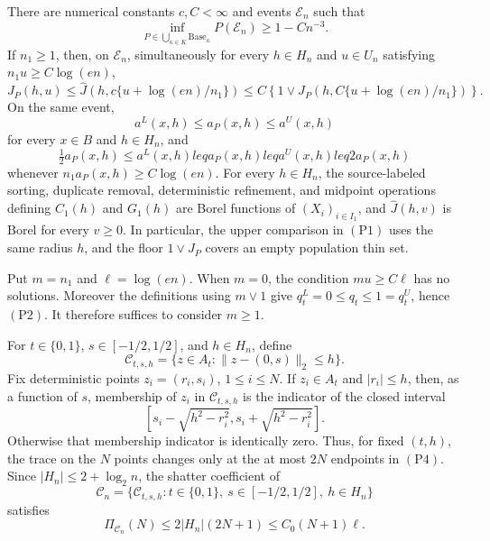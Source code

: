 There are numerical constants \(c,C<\infty\) and events \(\mathcal E_n\) such that
\[
 \inf_{P\in\bigcup_{\kappa\in K}\mathrm{Base}_\kappa}P(\mathcal E_n)
 \geq 1-Cn^{-3}.
\]
If \(n_1\geq1\), then, on \(\mathcal E_n\), simultaneously for every
\(h\in H_n\) and \(u\in U_n\) satisfying
\(n_1u\geq C\log(en)\),
\[
 J_P(h,u)
 \leq \widehat J\!\left(h,c\{u+\log(en)/n_1\}\right)
 \leq C\left\{1\vee
 J_P\!\left(h,C\{u+\log(en)/n_1\}\right)\right\}.                 \tag{P1}
\]
On the same event,
\[
 a^L(x,h)\leq a_P(x,h)\leq a^U(x,h)                              \tag{P2}
\]
for every \(x\in B\) and \(h\in H_n\), and
\[
 \tfrac12a_P(x,h)\leq a^L(x,h)leq a_P(x,h)leq a^U(x,h)leq2a_P(x,h) \tag{P3}
\]
whenever \(n_1a_P(x,h)\geq C\log(en)\).  For every \(h\in H_n\), the
source-labeled sorting, duplicate removal, deterministic refinement, and
midpoint operations defining \(C_1(h)\) and \(G_1(h)\) are Borel functions
of \((X_i)_{i\in I_1}\), and \(\widehat J(h,v)\) is Borel for every
\(v\geq0\).  In particular, the upper comparison in \((\mathrm{P1})\) uses
the same radius \(h\), and the floor \(1\vee J_P\) covers an empty population
thin set.

Put \(m=n_1\) and \(\ell=\log(en)\).  When \(m=0\), the condition
\(mu\geq C\ell\) has no solutions.  Moreover the definitions using
\(m\vee1\) give \(q_t^L=0\leq q_t\leq1=q_t^U\), hence \((\mathrm{P2})\).
It therefore suffices to consider \(m\geq1\).

For \(t\in\{0,1\}\), \(s\in[-1/2,1/2]\), and \(h\in H_n\), define
\[
 \mathcal C_{t,s,h}
 =\{z\in A_t:\|z-(0,s)\|_2\leq h\}.
\]
Fix deterministic points \(z_i=(r_i,s_i)\), \(1\leq i\leq N\).  If
\(z_i\in A_t\) and \(|r_i|\leq h\), then, as a function of \(s\),
membership of \(z_i\) in \(\mathcal C_{t,s,h}\) is the indicator of the
closed interval
\[
 \left[s_i-\sqrt{h^2-r_i^2},s_i+\sqrt{h^2-r_i^2}\right].           \tag{P4}
\]
Otherwise that membership indicator is identically zero.  Thus, for fixed
\((t,h)\), the trace on the \(N\) points changes only at the at most \(2N\)
endpoints in \((\mathrm{P4})\).  Since
\(|H_n|\leq2+\log_2 n\), the shatter coefficient of
\[
 \mathcal C_n
 =\{\mathcal C_{t,s,h}:t\in\{0,1\},\ s\in[-1/2,1/2],\ h\in H_n\}
\]
satisfies
\[
 \Pi_{\mathcal C_n}(N)
 \leq2|H_n|(2N+1)\leq C_0(N+1)\ell.                              \tag{P5}
\]

